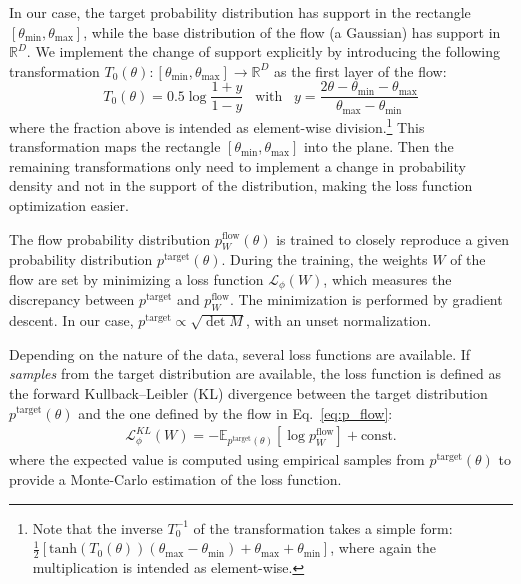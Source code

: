 \documentclass[twocolumn,showpacs,preprintnumbers,nofootinbib,prd,
superscriptaddress,10pt]{revtex4-2}
\begin{document}
In our case, the target probability distribution has support in the rectangle $[\theta_\text{min}, \theta_\text{max}]$, while the base distribution of the flow (a Gaussian) has support in $\mathbb{R}^D$. We implement the change of support explicitly by introducing the following transformation $T_0(\theta): [\theta_\text{min}, \theta_\text{max}] \to \mathbb{R}^D$ as the first layer of the flow:
%
\begin{equation}\label{eq:first_transform}
	T_0(\theta) = 0.5 \log \frac{1 + y}{1 - y} \;\;\; \text{with} \;\;\; y = \frac{2\theta - \theta_\text{min} - \theta_\text{max}}{\theta_\text{max}- \theta_\text{min}}
\end{equation}
where the fraction above is intended as element-wise division.\footnote{
Note that the inverse $T_0^{-1}$ of the transformation takes a simple form: $\frac{1}{2} [\text{tanh}(T_0(\theta))(\theta_\text{max} - \theta_\text{min})+\theta_\text{max}+ \theta_\text{min}]$, where again the multiplication is intended as element-wise.
}
This transformation maps the rectangle $[\theta_\text{min}, \theta_\text{max}]$ into the plane. Then the remaining transformations only need to implement a change in probability density and not in the support of the distribution, making the loss function optimization easier.

The flow probability distribution $p^\text{flow}_W(\theta)$ is trained to closely reproduce a given probability distribution $p^\text{target}(\theta)$.
During the training, the weights $W$ of the flow are set by minimizing a loss function $\mathcal{L}_\phi(W)$, which measures the discrepancy between $p^\text{target}$ and $p^\text{flow}_W$. The minimization is performed by gradient descent.
In our case, $p^\text{target} \propto \sqrt{\det M}$, with an unset normalization.

Depending on the nature of the data, several loss functions are available.
If {\it samples} from the target distribution are available, the loss function is defined as the forward Kullback–Leibler (KL) divergence between the target distribution $p^\text{target}(\theta)$ and the one defined by the flow in Eq.~\eqref{eq:p_flow}:
\begin{align}
	\mathcal{L}^{KL}_\phi(W) = - \mathbb{E}_{p^\text{target}(\theta)} [\log p^\text{flow}_W] + \text{const.}
\end{align}
where the expected value is computed using empirical samples from $p^\text{target}(\theta)$ to provide a Monte-Carlo estimation of the loss function.
\end{document}
